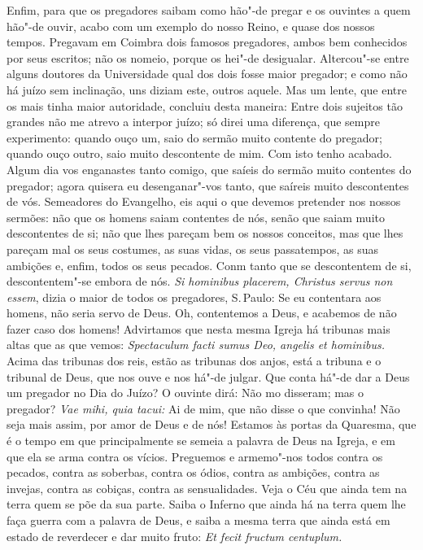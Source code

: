 Enfim, para que os pregadores saibam como hão"-de pregar e os ouvintes a
quem hão"-de ouvir, acabo com um exemplo do nosso Reino, e quase dos
nossos tempos. Pregavam em Coimbra dois famosos pregadores, ambos bem
conhecidos por seus escritos; não os nomeio, porque os hei"-de
desigualar. Altercou"-se entre alguns doutores da Universidade qual dos
dois fosse maior pregador; e como não há juízo sem inclinação, uns
diziam este, outros aquele. Mas um lente, que entre os mais tinha maior
autoridade, concluiu desta maneira: Entre dois sujeitos tão grandes
não me atrevo a interpor juízo; só direi uma diferença, que sempre experimento: quando ouço um, saio do sermão muito contente do pregador;
quando ouço outro, saio muito descontente de mim.
Com isto tenho acabado. Algum dia vos enganastes tanto comigo, que
saíeis do sermão muito contentes do pregador; agora quisera eu
desenganar"-vos tanto, que saíreis muito descontentes
de vós. Semeadores do Evangelho, eis aqui o que devemos pretender nos
nossos sermões: não que os homens saiam contentes de nós, senão que
saiam muito descontentes de si; não que lhes pareçam bem os nossos
conceitos, mas que lhes pareçam mal os seus costumes, as suas vidas, os
seus passatempos, as suas ambições e, enfim, todos os seus pecados. Conm
tanto que se descontentem de si, descontentem"-se embora de nós. \emph{Si
hominibus placerem, Christus servus non essem}, dizia o maior de
todos os pregadores, S.\,Paulo: Se eu contentara aos homens, não seria
servo de Deus. Oh, contentemos a Deus, e acabemos de não fazer caso
dos homens! Advirtamos que nesta mesma Igreja há tribunas mais altas
que as que vemos: \emph{Spectaculum facti sumus Deo, angelis et hominibus.} Acima das tribunas dos reis, estão as tribunas dos anjos, está
a tribuna e o tribunal de Deus, que nos ouve e nos há"-de julgar. Que
conta há"-de dar a Deus um pregador no Dia do Juízo? O ouvinte dirá:
Não mo disseram; mas o pregador? \emph{Vae mihi, quia tacui:} Ai
de mim, que não disse o que convinha! Não seja mais assim, por amor de
Deus e de nós!
Estamos às portas da Quaresma, que é o tempo em que principalmente se
semeia a palavra de Deus na Igreja, e em que ela se arma contra os
vícios. Preguemos e armemo"-nos todos contra os pecados, contra as
soberbas, contra os ódios, contra as ambições, contra as invejas, contra
as cobiças, contra as sensualidades. Veja o Céu que ainda tem na terra
quem se põe da sua parte. Saiba o Inferno que ainda há na terra quem lhe
faça guerra com a palavra de Deus, e saiba a mesma terra que ainda
está em estado de reverdecer e dar muito fruto: \emph{Et fecit fructum
centuplum.}
